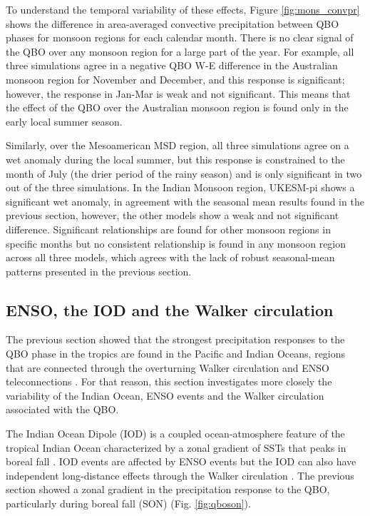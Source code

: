 To understand the temporal variability of these effects, Figure \ref{fig:mons_convpr} shows the difference in area-averaged convective precipitation between QBO phases for monsoon regions for each calendar month. There is no clear signal of the QBO over any monsoon region for a large part of the year. For example, all three simulations agree in a negative QBO W-E difference in the Australian monsoon region for November and December, and this response is significant; however, the response in Jan-Mar is weak and not significant. This means that the effect of the QBO over the Australian monsoon region is found only in the early local summer season.

 Similarly, over the Mesoamerican MSD region, all three simulations agree on a wet anomaly during the local summer, but this response is constrained to the month of July (the drier period of the rainy season) and is only significant in two out of the three simulations. 
 In the Indian Monsoon region, UKESM-pi shows a significant wet anomaly, in agreement with the seasonal mean results found in the previous section, however, the other models show a weak and not significant difference. 
Significant relationships are found for other monsoon regions in specific months but no consistent relationship is found in any monsoon region across all three models, which agrees with the lack of robust seasonal-mean patterns presented in the previous section. 





\subsection{ENSO, the IOD and the Walker circulation}



The previous section showed that the strongest precipitation responses to the QBO phase in the tropics are found in the Pacific and Indian Oceans, regions that are connected through the overturning Walker circulation and ENSO teleconnections \citep{cai2019pantropical}. For that reason, this section investigates more closely the variability of the Indian Ocean, ENSO events and the Walker circulation associated with the QBO.

The Indian Ocean Dipole (IOD) is a coupled ocean-atmosphere feature of the tropical Indian Ocean characterized by a zonal gradient of SSTs that peaks in boreal fall \citep{saji1999iod,wang2014iod,mckenna2020iod}. IOD events are affected by ENSO events but  the IOD  can also have independent long-distance effects through the Walker circulation \citep{wang2014iod}. The previous section showed a zonal gradient in the precipitation response to the QBO, particularly during boreal fall (SON) (Fig. \ref{fig:qboson}). %

